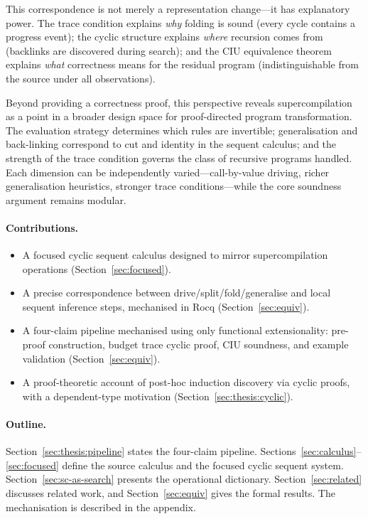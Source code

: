 This correspondence is not merely a representation change---it has explanatory power.
The trace condition explains \emph{why} folding is sound (every cycle contains a progress event);
the cyclic structure explains \emph{where} recursion comes from (backlinks are discovered during search);
and the CIU equivalence theorem explains \emph{what} correctness means for the residual program (indistinguishable from the source under all observations).

Beyond providing a correctness proof, this perspective reveals supercompilation as a point in a broader design space for proof-directed program transformation. The evaluation strategy determines which rules are invertible; generalisation and back-linking correspond to cut and identity in the sequent calculus; and the strength of the trace condition governs the class of recursive programs handled. Each dimension can be independently varied---call-by-value driving, richer generalisation heuristics, stronger trace conditions---while the core soundness argument remains modular.

\paragraph{Contributions.}
\begin{itemize}[leftmargin=*]
\item A focused cyclic sequent calculus designed to mirror supercompilation operations (Section~\ref{sec:focused}).
\item A precise correspondence between drive/split/fold/generalise and local sequent inference steps, mechanised in Rocq (Section~\ref{sec:equiv}).
\item A four-claim pipeline mechanised using only functional extensionality: pre-proof construction, budget trace cyclic proof, CIU soundness, and example validation (Section~\ref{sec:equiv}).
\item A proof-theoretic account of post-hoc induction discovery via cyclic proofs, with a dependent-type motivation (Section~\ref{sec:thesis:cyclic}).
\end{itemize}

\paragraph{Outline.}
Section~\ref{sec:thesis:pipeline} states the four-claim pipeline.
Sections~\ref{sec:calculus}--\ref{sec:focused} define the source calculus and the focused cyclic sequent system.
Section~\ref{sec:sc-as-search} presents the operational dictionary.
Section~\ref{sec:related} discusses related work, and Section~\ref{sec:equiv} gives the formal results.
The mechanisation is described in the appendix.


